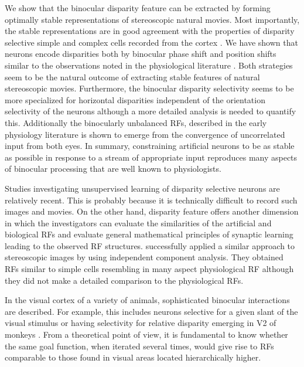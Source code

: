 {We show that the binocular disparity feature can be extracted by forming
optimally stable representations of stereoscopic natural movies.  Most
importantly, the stable representations are in good agreement with the
properties of disparity selective simple and complex cells recorded from
the cortex \citep{anzai1999a,anzai1999b}. We have shown that neurons encode
disparities both by binocular phase shift and position shifts similar to
the observations noted in the physiological literature \citep{anzai1997a}.
Both strategies seem to be the natural outcome of extracting stable
features of natural stereoscopic movies. Furthermore, the binocular
disparity selectivity seems to be more specialized for horizontal
disparities independent of the orientation selectivity of the neurons
\citep{cumming2002a} although a more detailed analysis is needed to
quantify this. Additionally the binocularly unbalanced RFs, described in
the early physiology literature \citep{hubel1962b} is shown to emerge from
the convergence of uncorrelated input from both eyes. In summary,
constraining artificial neurons to be as stable as possible in response to
a stream of appropriate input reproduces many aspects of binocular
processing that are well known to physiologists.


Studies investigating unsupervised learning of disparity selective neurons
are relatively recent. This is probably because it is technically difficult
to record such images and movies. On the other hand, disparity feature
offers another dimension in which the investigators can evaluate the
similarities of the artificial and biological RFs and evaluate general
mathematical principles of synaptic learning leading to the observed RF
structures.  \cite{hoyer2000a} successfully applied a similar approach to
stereoscopic images by using independent component analysis. They obtained
RFs similar to simple cells resembling in many aspect physiological RF
although they did not make a detailed comparison to the physiological RFs.

		 
In the visual cortex of a variety of animals, sophisticated binocular
interactions are described. For example, this includes neurons selective
for a given slant of the visual stimulus or having selectivity for relative
disparity emerging in V2  of
monkeys \citep{thomas2002a}. From a theoretical point of view, it is
fundamental to know whether the same goal function, when iterated several
times, would give rise to RFs comparable to those found in visual areas
located hierarchically higher.
				 

}
